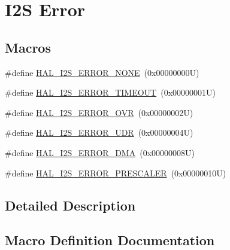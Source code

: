 \hypertarget{group___i2_s___error}{}\section{I2S Error}
\label{group___i2_s___error}
\subsection*{Macros}
\begin{DoxyCompactItemize}
\item 
\#define \hyperlink{group___i2_s___error_ga33ddce8f08b6679386cb5f119a4ec61f}{H\+A\+L\+\_\+\+I2\+S\+\_\+\+E\+R\+R\+O\+R\+\_\+\+N\+O\+NE}~(0x00000000\+U)
\item 
\#define \hyperlink{group___i2_s___error_ga996f26e56aef3496b7c490b119f1bcc6}{H\+A\+L\+\_\+\+I2\+S\+\_\+\+E\+R\+R\+O\+R\+\_\+\+T\+I\+M\+E\+O\+UT}~(0x00000001\+U)
\item 
\#define \hyperlink{group___i2_s___error_gad8e43b3c6ff9233ea7c233f414bd2201}{H\+A\+L\+\_\+\+I2\+S\+\_\+\+E\+R\+R\+O\+R\+\_\+\+O\+VR}~(0x00000002\+U)
\item 
\#define \hyperlink{group___i2_s___error_ga1c4ae6b04b16718ed666cf46d14bf19e}{H\+A\+L\+\_\+\+I2\+S\+\_\+\+E\+R\+R\+O\+R\+\_\+\+U\+DR}~(0x00000004\+U)
\item 
\#define \hyperlink{group___i2_s___error_ga35de5c864ec5a042193f271af1960195}{H\+A\+L\+\_\+\+I2\+S\+\_\+\+E\+R\+R\+O\+R\+\_\+\+D\+MA}~(0x00000008\+U)
\item 
\#define \hyperlink{group___i2_s___error_ga91f7af0ab1de664d48a467e524c223a3}{H\+A\+L\+\_\+\+I2\+S\+\_\+\+E\+R\+R\+O\+R\+\_\+\+P\+R\+E\+S\+C\+A\+L\+ER}~(0x00000010\+U)
\end{DoxyCompactItemize}


\subsection{Detailed Description}


\subsection{Macro Definition Documentation}
\mbox{\label{group___i2_s___error_ga35de5c864ec5a042193f271af1960195}} 
